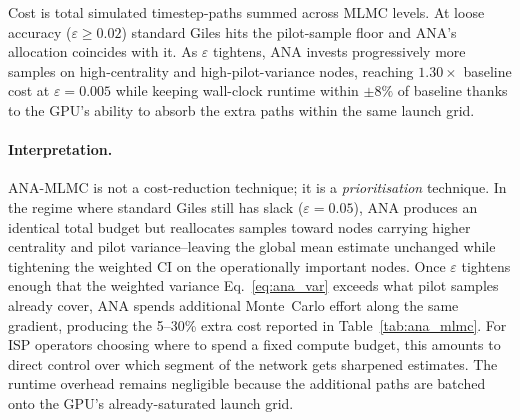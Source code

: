 \documentclass{ieeeaccess}
\begin{document}
\begin{table}[!t]
\caption{ANA-MLMC vs.\ Standard Giles Allocation (Barabasi-Albert $n=500$,
         $m=3$, NVIDIA T4, 5-seed mean$\pm$SD)}
\label{tab:ana_mlmc}
\centering
{}
\vspace{2pt}\footnotesize Cost is total simulated timestep-paths summed across MLMC levels.
At loose accuracy ($\varepsilon\!\ge\!0.02$) standard Giles hits the pilot-sample floor and
ANA's allocation coincides with it. As $\varepsilon$ tightens, ANA invests progressively more
samples on high-centrality and high-pilot-variance nodes, reaching $1.30\times$ baseline cost at
$\varepsilon=0.005$ while keeping wall-clock runtime within $\pm 8\%$ of baseline thanks to the
GPU's ability to absorb the extra paths within the same launch grid.\normalsize
\end{table}

\paragraph{Interpretation.}
ANA-MLMC is not a cost-reduction technique; it is a \emph{prioritisation} technique. In the
regime where standard Giles still has slack ($\varepsilon=0.05$), ANA produces an identical total
budget but reallocates samples toward nodes carrying higher centrality and pilot variance--leaving
the global mean estimate unchanged while tightening the weighted CI on the operationally important
nodes. Once $\varepsilon$ tightens enough that the weighted variance Eq.~\eqref{eq:ana_var}
exceeds what pilot samples already cover, ANA spends additional Monte~Carlo effort along the same
gradient, producing the 5--30\% extra cost reported in Table~\ref{tab:ana_mlmc}. For ISP
operators choosing where to spend a fixed compute budget, this amounts to direct control over
which segment of the network gets sharpened estimates. The runtime overhead remains negligible
because the additional paths are batched onto the GPU's already-saturated launch grid.
\end{document}
